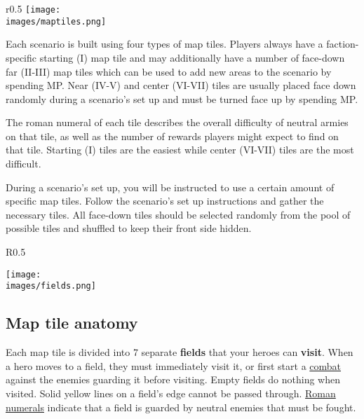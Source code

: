 
\begin{wrapfigure}{r}{0.5\textwidth}
  \texttt{[image: \\images/maptiles.png]}
\end{wrapfigure}

Each scenario is built using four types of map tiles.
Players always have a faction-specific starting (I) map tile and may additionally have a number of face-down far (II-III) map tiles which can be used to add new areas to the scenario by spending MP.
Near (IV-V) and center (VI-VII) tiles are usually placed face down randomly during a scenario’s set up and must be turned face up by spending MP.\par
The roman numeral of each tile describes the overall difficulty of neutral armies on that tile, as well as the number of rewards players might expect to find on that tile.
Starting (I) tiles are the easiest while center (VI-VII) tiles are the most difficult.\par
During a scenario’s set up, you will be instructed to use a certain amount of specific map tiles.
Follow the scenario’s set up instructions and gather the necessary tiles.
All face-down tiles should be selected randomly from the pool of possible tiles and shuffled to keep their front side hidden.\par
\begin{wrapfigure}{R}{0.5\textwidth}
  \begin{center}
  \texttt{[image: \\images/fields.png]}
  \end{center}
\end{wrapfigure}
\subsection*{Map tile anatomy}
Each map tile is divided into 7 separate \textbf{fields} that your heroes can \textbf{visit}.
When a hero moves to a field, they must immediately visit it, or
first start a \hyperlink{Combat}{combat} against the enemies guarding it before visiting.
Empty fields do nothing when visited.
Solid yellow lines on a field's edge cannot be passed through.
\hyperlink{Difficulty}{Roman numerals} indicate that a field is guarded by neutral enemies that must be fought.\par

\clearpage


